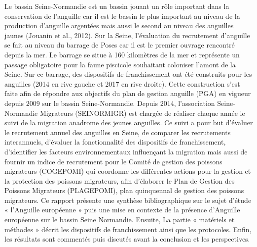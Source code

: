 \documentclass[11pt,titlepage,twoside]{article}\usepackage[]{graphicx}\usepackage[table]{xcolor}
\begin{document}
Le bassin Seine-Normandie est un bassin jouant un rôle important dans la conservation de l’anguille car il est le bassin le plus important au niveau de la production d’anguille argentées mais aussi le second au niveau des anguilles jaunes (Jouanin et al., 2012). 
Sur la Seine, l’évaluation du recrutement d’anguille se fait au niveau du barrage de Poses car il est le premier ouvrage rencontré depuis la mer. Le barrage se situe à 160 kilomètres de la mer et représente un passage obligatoire pour la faune piscicole souhaitant coloniser l’amont de la Seine. 
Sur ce barrage, des dispositifs de franchissement ont été construits pour les anguilles (2014 en rive gauche et 2017 en rive droite). Cette construction s’est faite afin de répondre aux objectifs du plan de gestion anguille (PGA) en vigueur depuis 2009 sur le bassin Seine-Normandie. 
Depuis 2014, l’association Seine-Normandie Migrateurs (SEINORMIGR) est chargée de réaliser chaque année le suivi de la migration anadrome des jeunes anguilles. Ce suivi a pour but d’évaluer le recrutement annuel des anguilles en Seine, de comparer les recrutements interannuels, d’évaluer la fonctionnalité des dispositifs de franchissement, d’identifier les facteurs environnementaux influençant la migration mais aussi de fournir un indice de recrutement pour le Comité de gestion des poissons migrateurs (COGEPOMI) qui coordonne les différentes actions pour la gestion et la protection des poissons migrateurs, afin d’élaborer le Plan de Gestion des Poissons Migrateurs (PLAGEPOMI), plan quinquennal de gestion des poissons migrateurs.
Ce rapport présente une synthèse bibliographique sur le sujet d’étude « l’Anguille européenne » puis une mise en contexte de la présence d’Anguille européenne sur le bassin Seine Normandie. Ensuite, La partie « matériels et méthodes » décrit les dispositifs de franchissement ainsi que les protocoles. Enfin, les résultats sont commentés puis discutés avant la conclusion et les perspectives.





\normalsize
\null
\vfill
\end{document}
